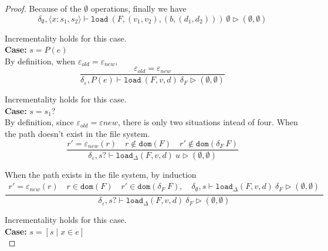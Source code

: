 \documentclass[10pt,twoside,a4paper]{article}
\theoremstyle{theorem}
\theoremstyle{lemma}
\theoremstyle{property}
\theoremstyle{definition}
\theoremstyle{assumption}
\begin{document}
\begin{proof}
	Because of the $\emptyset$ operations, finally we have
	\begin{displaymath}
		\delta_{\emptyset}, \langle x:s_1,s_2 \rangle \vdash \mathtt{load}~ (F,(v_1,v_2),(b,(d_1,d_2)))~ \emptyset \rhd (\emptyset, \emptyset) 
	\end{displaymath}

	Incrementality holds for this case.\\

	\textbf{Case: } $s = P(e)$\\

		By definition, when $\varepsilon_{old} = \varepsilon_{new}$,
		\begin{displaymath}
			\frac{ \varepsilon_{old} = \varepsilon_{new}}
			{\delta_\varepsilon, P(e) \vdash \mathtt{load}~ (F,v,d) ~\delta_F \rhd (\emptyset, \emptyset)}
		\end{displaymath}

		Incrementality holds for this case.\\

	\textbf{Case: } $s = s_1?$\\

	By definition, since $\varepsilon_{old} = \varepsilon{new}$, there is only two situations intead of four. When the path doesn't exist in the file system.
	\begin{displaymath}
	\frac{
		r' = \varepsilon_{new}(r) \quad r \notin \mathtt{dom}(F) \quad r' \notin \mathtt{dom}(\delta_F~F)
	}
	{\delta_\varepsilon, s? \vdash \mathtt{load}_\Delta (F,v,d)~ u \rhd (\emptyset, \emptyset)}
	\end{displaymath}

	When the path exists in the file system, by induction
	\begin{displaymath}
	\frac{\begin{array}{c}
	r' = \varepsilon_{new}(r) \quad r \in \mathtt{dom}(F) \quad r' \in \mathtt{dom}(\delta_F~F), \quad
		\delta_{\emptyset}, s \vdash \mathtt{load}_\Delta (F,v,d)~ \delta_F \rhd (\emptyset, \emptyset)
	\end{array}}
	{\delta_\varepsilon, s? \vdash \mathtt{load}_\Delta (F,v,d)~ \delta_F \rhd (\emptyset,\emptyset)}
	\end{displaymath}

	Incrementality holds for this case.\\

	\textbf{Case: } $s = [ s \mid x \in e]$\\


\end{proof}
\end{document}
